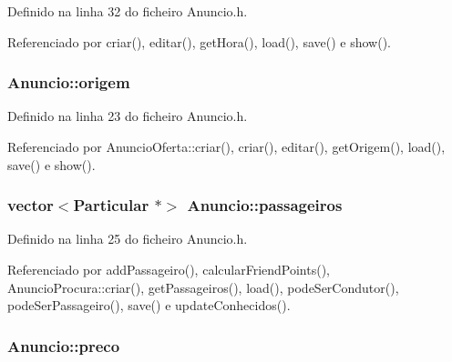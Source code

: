 Definido na linha 32 do ficheiro Anuncio.\+h.



Referenciado por criar(), editar(), get\+Hora(), load(), save() e show().

\hypertarget{class_anuncio_a9b3f8ac29ebf2a44e24ea2273064a7f5}{
\subsubsection[{origem}]{ Anuncio\+::origem\hspace{0.3cm}{\ttfamily [protected]}}}\label{class_anuncio_a9b3f8ac29ebf2a44e24ea2273064a7f5}


Definido na linha 23 do ficheiro Anuncio.\+h.



Referenciado por Anuncio\+Oferta\+::criar(), criar(), editar(), get\+Origem(), load(), save() e show().

\hypertarget{class_anuncio_a76cdb1291df7bd8736141304d759ef35}{
\subsubsection[{passageiros}]{\setlength{\rightskip}{0pt plus 5cm}vector$<${\bf Particular} $\ast$$>$ Anuncio\+::passageiros\hspace{0.3cm}{\ttfamily [protected]}}}\label{class_anuncio_a76cdb1291df7bd8736141304d759ef35}


Definido na linha 25 do ficheiro Anuncio.\+h.



Referenciado por add\+Passageiro(), calcular\+Friend\+Points(), Anuncio\+Procura\+::criar(), get\+Passageiros(), load(), pode\+Ser\+Condutor(), pode\+Ser\+Passageiro(), save() e update\+Conhecidos().

\hypertarget{class_anuncio_aa780fd8e07586a3af117fd20593fb1b4}{
\subsubsection[{preco}]{ Anuncio\+::preco\hspace{0.3cm}{\ttfamily [protected]}}}\label{class_anuncio_aa780fd8e07586a3af117fd20593fb1b4}


